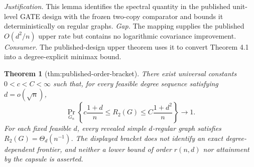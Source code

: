 \documentclass{article}
\newtheorem{theorem}{Theorem}
\begin{document}
\par\smallskip\noindent \textit{Justification.} This lemma identifies the spectral quantity in the published unit-level GATE design with the frozen two-copy comparator and bounds it deterministically on regular graphs. \textit{Gap.} The mapping supplies the published \(O(d^2/n)\) upper rate but contains no logarithmic covariance improvement. \textit{Consumer.} The published-design upper theorem uses it to convert Theorem 4.1 into a degree-explicit minimax bound.

\begin{theorem}[thm:published-order-bracket]\label{thm:published-order-bracket}
There exist universal constants \(0<c<C<\infty\) such that, for every feasible degree sequence satisfying \(d=o(\sqrt n)\), \[\Pr_{G_n}\!\left\{c\frac{1+d}{n}\le R_2(G)\le C\frac{1+d^2}{n}\right\}\longrightarrow1.\] For each fixed feasible \(d\), every revealed simple \(d\)-regular graph satisfies \(R_2(G)=\Theta_d(n^{-1})\). The displayed bracket does not identify an exact degree-dependent frontier, and neither a lower bound of order \(r(n,d)\) nor attainment by the capsule is asserted.
\end{theorem}
\end{document}
